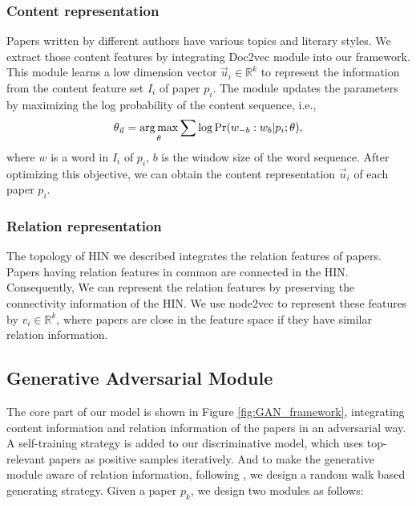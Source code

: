 \documentclass[letterpaper]{article} %
\begin{document}
\subsubsection{Content representation} \label{sec:content}
Papers written by different authors have various topics and literary styles.
We extract those content features by integrating Doc2vec module \cite{Doc2vec} into our framework. This module learns a low dimension vector $\vec{u}_i \in \mathbb{R}^k$ to represent the information from the content feature set $I_i$ of paper $p_i$. The module updates the parameters by maximizing the log probability of the content sequence, i.e.,
\begin{equation}
\centering
\theta_{\vec{u}} = \mathop{\arg\max}_{\theta} \sum \log \text{Pr}(w_{-b}:w_{b}|p_i; \theta),
\label{eq:doc2vec}
\end{equation}
where $w$ is a word in $I_i$ of $p_i$, $b$ is the window size of the word sequence.
After optimizing this objective, we can obtain the content representation $\vec{u}_i$ of each paper $p_i$.

\subsubsection{Relation representation} \label{sec:relation}
The topology of HIN we described integrates the relation features of papers.
Papers having relation features in common are connected in the HIN.
Consequently, We can represent the relation features by preserving the connectivity information of the HIN.
We use node2vec \cite{Node2vec} to represent these features by $v_i \in \mathbb{R}^k$, where papers are close in the feature space if they have similar relation information.

\subsection{Generative Adversarial Module}

The core part of our model is shown in Figure \ref{fig:GAN_framework}, integrating content information and relation information of the papers in an adversarial way.
A self-training strategy is added to our discriminative model, which uses top-relevant papers as positive samples iteratively.
And to make the generative module aware of relation information, following \cite{GraphGAN}, we design a random walk based generating strategy.
Given a paper $p_k$, we design two modules as follows:
\end{document}
